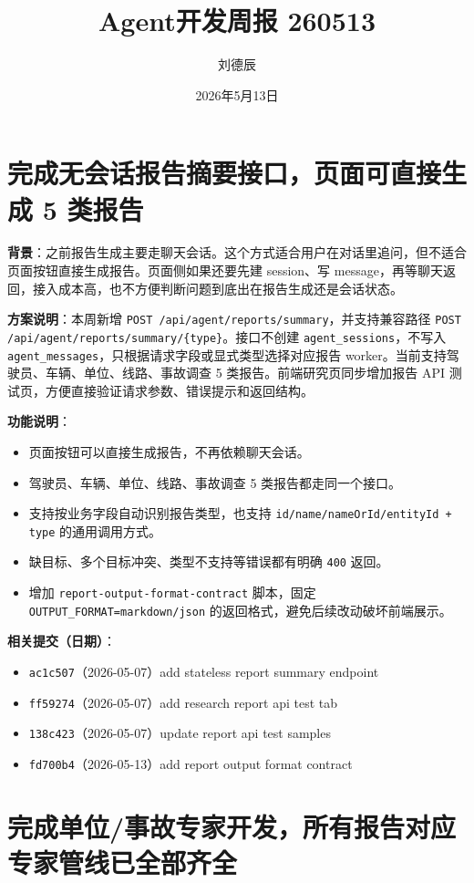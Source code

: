 \documentclass[UTF8]{ctexart}
\title{Agent开发周报 260513}
\author{刘德辰}
\date{2026年5月13日}
\begin{document}
\maketitle

\section{完成无会话报告摘要接口，页面可直接生成 5 类报告}

\textbf{背景}：之前报告生成主要走聊天会话。这个方式适合用户在对话里追问，但不适合页面按钮直接生成报告。页面侧如果还要先建 session、写 message，再等聊天返回，接入成本高，也不方便判断问题到底出在报告生成还是会话状态。

\textbf{方案说明}：本周新增 \texttt{POST /api/agent/reports/summary}，并支持兼容路径 \texttt{POST /api/agent/reports/summary/\{type\}}。接口不创建 \texttt{agent\_sessions}，不写入 \texttt{agent\_messages}，只根据请求字段或显式类型选择对应报告 worker。当前支持驾驶员、车辆、单位、线路、事故调查 5 类报告。前端研究页同步增加报告 API 测试页，方便直接验证请求参数、错误提示和返回结构。

\textbf{功能说明}：
\begin{itemize}
\item 页面按钮可以直接生成报告，不再依赖聊天会话。
\item 驾驶员、车辆、单位、线路、事故调查 5 类报告都走同一个接口。
\item 支持按业务字段自动识别报告类型，也支持 \texttt{id/name/nameOrId/entityId + type} 的通用调用方式。
\item 缺目标、多个目标冲突、类型不支持等错误都有明确 \texttt{400} 返回。
\item 增加 \texttt{report-output-format-contract} 脚本，固定 \texttt{OUTPUT\_FORMAT=markdown/json} 的返回格式，避免后续改动破坏前端展示。
\end{itemize}

\textbf{相关提交（日期）}：
\begin{itemize}
\item \texttt{ac1c507}（2026-05-07）add stateless report summary endpoint
\item \texttt{ff59274}（2026-05-07）add research report api test tab
\item \texttt{138c423}（2026-05-07）update report api test samples
\item \texttt{fd700b4}（2026-05-13）add report output format contract
\end{itemize}

\section{完成单位/事故专家开发，所有报告对应专家管线已全部齐全}
\end{document}
